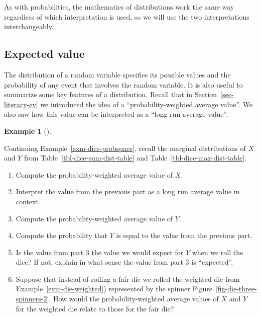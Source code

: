 \documentclass[
  letterpaper,
  DIV=11,
  numbers=noendperiod]{scrreprt}
\providecommand{\tightlist}{%
  \setlength{\itemsep}{0pt}\setlength{\parskip}{0pt}}
\theoremstyle{plain}
\theoremstyle{definition}
\newtheorem{example}{Example}[chapter]
\theoremstyle{definition}
\theoremstyle{definition}
\theoremstyle{remark}
\begin{document}
As with probabilities, the mathematics of distributions work the same
way regardless of which interpretation is used, so we will use the two
interpretations interchangeably.

\subsection{Expected value}\label{sec-dist-intro-ev}

The distribution of a random variable specifies its possible values and
the probability of any event that involves the random variable. It is
also useful to summarize some key features of a distribution. Recall
that in Section~\ref{sec-literacy-ev} we introduced the idea of a
``probability-weighted average value''. We also saw how this value can
be interpreted as a ``long run average value''.

\begin{tcolorbox}[enhanced jigsaw, opacityback=0, left=2mm, colframe=quarto-callout-note-color-frame, toprule=.15mm, breakable, colback=white, leftrule=.75mm, arc=.35mm, rightrule=.15mm, bottomrule=.15mm]

\begin{example}[]\protect\hypertarget{exm-dice-ev-intro}{}\label{exm-dice-ev-intro}

Continuing Example~\ref{exm-dice-probspace}, recall the marginal
distributions of \(X\) and \(Y\) from
Table~\ref{tbl-dice-sum-dist-table} and
Table~\ref{tbl-dice-max-dist-table}.

\begin{enumerate}
\def\labelenumi{\arabic{enumi}.}
\tightlist
\item
  Compute the probability-weighted average value of \(X\).
\item
  Interpret the value from the previous part as a long run average value
  in context.
\item
  Compute the probability-weighted average value of \(Y\).
\item
  Compute the probability that \(Y\) is equal to the value from the
  previous part.
\item
  Is the value from part 3 the value we would expect for \(Y\) when we
  roll the dice? If not, explain in what sense the value from part 3 is
  ``expected''.
\item
  Suppose that instead of rolling a fair die we rolled the weighted die
  from Example~\ref{exm-die-weighted}) represented by the spinner
  Figure~\ref{fig-die-three-spinners-2}. How would the
  probability-weighted average values of \(X\) and \(Y\) for the
  weighted die relate to those for the fair die?
\end{enumerate}

\end{example}

\end{tcolorbox}
\end{document}
